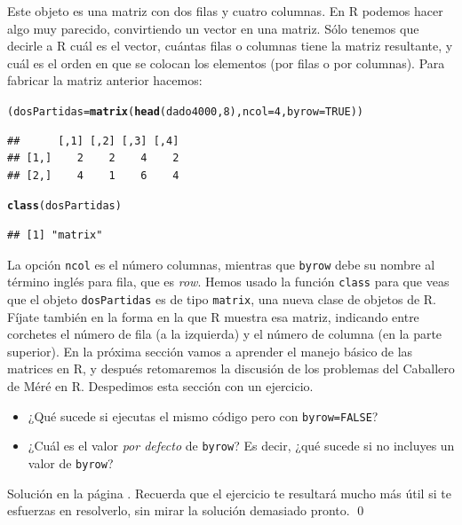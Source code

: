 \documentclass[10pt,a4paper]{article}\usepackage[]{graphicx}\usepackage[]{color}
\makeatletter
\newcommand{\hlnum}[1]{\textcolor[rgb]{0.686,0.059,0.569}{#1}}%
\newcommand{\hlstd}[1]{\textcolor[rgb]{0.345,0.345,0.345}{#1}}%
\newcommand{\hlkwb}[1]{\textcolor[rgb]{0.69,0.353,0.396}{#1}}%
\newcommand{\hlkwc}[1]{\textcolor[rgb]{0.333,0.667,0.333}{#1}}%
\newcommand{\hlkwd}[1]{\textcolor[rgb]{0.737,0.353,0.396}{\textbf{#1}}}%
\newenvironment{kframe}{%
 \def\at@end@of@kframe{}%
 \ifinner\ifhmode%
  \def\at@end@of@kframe{\end{minipage}}%
  \begin{minipage}{\columnwidth}%
 \fi\fi%
 \def\FrameCommand##1{\hskip\@totalleftmargin \hskip-\fboxsep
 \colorbox{shadecolor}{##1}\hskip-\fboxsep
     \hskip-\linewidth \hskip-\@totalleftmargin \hskip\columnwidth}%
 \MakeFramed {\advance\hsize-\width
   \@totalleftmargin\z@ \linewidth\hsize
   \@setminipage}}%
 {\par\unskip\endMakeFramed%
 \at@end@of@kframe}
\newenvironment{knitrout}{}{} %
\makeatother
\begin{document}
Este objeto es una matriz con dos filas y cuatro columnas. En R podemos hacer algo muy parecido, convirtiendo un vector en una matriz. Sólo tenemos que decirle a R cuál es el vector, cuántas filas o columnas tiene la matriz resultante, y cuál es el orden en que se colocan los elementos (por filas o por columnas). Para fabricar la matriz anterior hacemos:
\begin{knitrout}
\color{fgcolor}\begin{kframe}
\begin{alltt}
\hlstd{(dosPartidas} \hlkwb{=} \hlkwd{matrix}\hlstd{(} \hlkwd{head}\hlstd{(dado4000,} \hlnum{8}\hlstd{),} \hlkwc{ncol}\hlstd{=}\hlnum{4}\hlstd{,} \hlkwc{byrow}\hlstd{=}\hlnum{TRUE}\hlstd{))}
\end{alltt}
\begin{verbatim}
##      [,1] [,2] [,3] [,4]
## [1,]    2    2    4    2
## [2,]    4    1    6    4
\end{verbatim}
\begin{alltt}
\hlkwd{class}\hlstd{(dosPartidas)}
\end{alltt}
\begin{verbatim}
## [1] "matrix"
\end{verbatim}
\end{kframe}
\end{knitrout}
     La opción {\tt ncol} es el número columnas, mientras que {\tt byrow} debe su nombre al término inglés para fila, que es {\em row}.  Hemos usado la función {\tt class} para que veas que el objeto {\tt dosPartidas} es de tipo {\tt matrix}, una nueva clase de objetos de R. Fíjate también en la forma en la que R muestra esa matriz, indicando entre corchetes el número de fila (a la izquierda) y el número de columna (en la parte superior). En la próxima sección vamos a aprender el manejo básico de las matrices en R, y después retomaremos la discusión de los problemas del Caballero de Méré en R. Despedimos esta sección con un ejercicio.
\begin{ejercicio}
\label{tut03:ejercicio02}
\quad
\begin{itemize}
\item ¿Qué sucede si ejecutas el mismo código pero con {\tt byrow=FALSE}?
\item ¿Cuál es el valor {\em por defecto} de {\tt byrow}? Es decir, ¿qué sucede si no incluyes un valor de {\tt byrow}?
\end{itemize}
Solución en la página \pageref{tut03:ejercicio02:sol}. Recuerda que el ejercicio te resultará mucho más útil si te esfuerzas en resolverlo, sin mirar la solución demasiado pronto.
\qed
\end{ejercicio}
\end{document}
